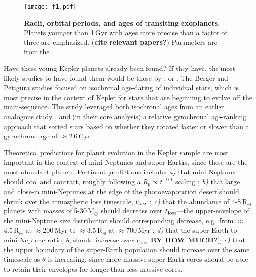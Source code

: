 \documentclass[12pt,twocolumn,tighten]{aastex63}
\begin{document}
\begin{figure}[!t]
	\begin{center}
		\leavevmode
		\texttt{[image: f1.pdf]}
	\end{center}
	\vspace{-0.6cm}
	\caption{
		{\bf Radii, orbital periods, and ages of transiting exoplanets}.
    Planets younger than 1\,Gyr with ages more precise than a
    factor of three are emphasized. 
    ({\bf cite relevant papers?})
    Parameters are from the \citet{PSCompPars}.
		\label{fig:rp_period_age}
	}
\end{figure}

Have these young Kepler planets already been found?  If they have, the
most likely studies to have found them would be those by
\citet{Berger_2020b_rpage}, \citet{David_2021} or
\citet{Petigura_2022}.  The Berger and Petigura studies focused on
isochronal age-dating of individual stars, which is most precise in
the context of Kepler for stars that are beginning to evolve off the
main-sequence.  The \citet{David_2021} study leveraged both isochronal
ages from an earlier analogous study
\citep{Fulton_Petigura_2018_cks_vii}, and (in their core analysis) a
relative gyrochronal age-ranking approach that sorted stars based on
whether they rotated faster or slower than a gyrochrone age of
$\approx$2.6\,Gyr \citep{Meibom_2015,Curtis_2020}.

Theoretical predictions for planet evolution in the Kepler sample are
most important in the context of mini-Neptunes and super-Earths, since
these are the most abundant planets.  Pertinent predictions include:
{\it a)} that mini-Neptunes should cool and contract, roughly
following a $R_p \propto t^{-0.1}$ scaling \citep{Gupta_2019}; {\it
b)} that large and close-in mini-Neptunes at the edge of the
photoevaporation desert should shrink over the atmospheric loss
timescale, $t_{\rm loss}$ \citep{Owen_Lai_2018}; {\it c)} that the
abundance of 4-8\,R$_\oplus$ planets with masses of 5-30\,M$_\oplus$
should decrease over $t_{\rm loss}$---the upper-envelope of the
mini-Neptune size distribution should corresponding decrease,
e.g.~from $\approx$4.5\,R$_\oplus$ at $\approx$200\,Myr to
$\approx$3.5\,R$_\oplus$ at $\approx$700\,Myr
\citep[e.g.][]{Rogers_2021}; {\it d)} that the super-Earth to
mini-Neptune ratio, $\theta$, should increase over $t_{\rm loss}$
\citep[e.g.][]{Rogers_2021} {\bf BY HOW MUCH?}); {\it e)} that the
upper boundary of the super-Earth population should increase over the
same timescale as $\theta$ is increasing, since more massive
super-Earth cores should be able to retain their envelopes for longer
than less massive cores.
\end{document}
